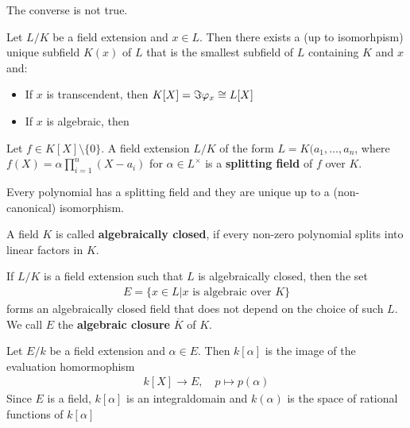 The converse is not true.



\begin{prop}[]
  Let $L/K$ be a field extension and $x \in L$. 
  Then there exists a (up to isomorhpism) unique subfield $K(x)$ of $L$ that is the smallest subfield of $L$ containing $K$ and $x$ and:
  \begin{itemize}
    \item If $x$ is transcendent, then $K[X] = \Im \varphi_x \cong L[X]$
    \item If $x$ is algebraic, then
  \end{itemize}

\end{prop}



\begin{dfn}[]
  Let $f \in K[X] \setminus \{0\}$. A field extension $L/K$ of the form $L = K(a_{1}, \ldots, a_{n}$, where $f(X) = \alpha \prod_{i=1}^{n}(X - a_i)$ for $\alpha \in L^{\times}$ is a \textbf{splitting field} of $f$ over $K$.
\end{dfn}
Every polynomial has a splitting field and they are unique up to a (non-canonical) isomorphism.


\begin{dfn}[]
  A field $K$ is called \textbf{algebraically closed}, if every
  non-zero polynomial splits into linear factors in $K$.

  If $L/K$ is a field extension such that $L$ is algebraically closed, then the set
  \begin{align*}
    E = \{x \in L \big\vert x \text{ is algebraic over }K\}
  \end{align*}
  forms an algebraically closed field that does not depend on the choice of such $L$.
  We call $E$ the \textbf{algebraic closure} $\overline{K}$ of $K$.
\end{dfn}

\begin{dfn}[]
  Let $E/k$ be a field extension and $\alpha \in E$. Then $k[\alpha]$ is the image of the evaluation homormophism
  \begin{align*}
    k[X] \to E, \quad p \mapsto  p(\alpha)
  \end{align*}
  Since $E$ is a field, $k[\alpha]$ is an integraldomain and $k(\alpha)$ is the space of rational functions of $k[\alpha]$
\end{dfn}
